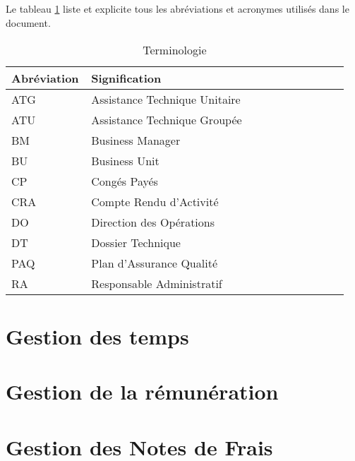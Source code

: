 \documentclass[12pt]{scrreprt}
\begin{document}
\paragraph{} Le tableau \ref{abbr} liste et explicite tous les abréviations et acronymes utilisés dans le document.
\begin{table}[H]
\begin{center}
    \begin{longtable}{|p{0.2\linewidth}|p{0.75\linewidth}|}
    \hline  %
    \rowcolor[gray]{.8}
    Abréviation & Signification\\
    \hline
    ATG & Assistance Technique Unitaire\\
    \hline
    ATU & Assistance Technique Groupée\\
    \hline
    BM & Business Manager\\
    \hline
    BU & Business Unit \\
    \hline
    CP & Congés Payés\\
    \hline
    CRA & Compte Rendu d'Activité\\
    \hline
    DO & Direction des Opérations\\
    \hline
    DT & Dossier Technique\\
    \hline
    PAQ & Plan d'Assurance Qualité\\
    \hline
    RA& Responsable Administratif\\
    \hline
    \end{longtable}
    \caption{Terminologie}
    \label{abbr}
\end{center}
\end{table}




\chapter{Gestion des temps}



\chapter{Gestion de la rémunération}

\chapter{Gestion des Notes de Frais}

\end{document}
